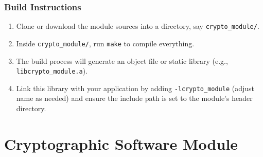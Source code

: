 \documentclass[11pt,a4paper]{report}
\theoremstyle{definitionstyle}
\begin{document}
\subsection{Build Instructions}

\begin{enumerate}
	\item Clone or download the module sources into a directory, say \texttt{crypto\_module/}.
	\item Inside \texttt{crypto\_module/}, run \texttt{make} to compile everything.
	\item The build process will generate an object file or static library (e.g., \texttt{libcrypto\_module.a}).
	\item Link this library with your application by adding \texttt{-lcrypto\_module} (adjust name as needed) and ensure the include path is set to the module's header directory.
\end{enumerate}

\newpage
\chapter{Cryptographic Software Module}

\end{document}
